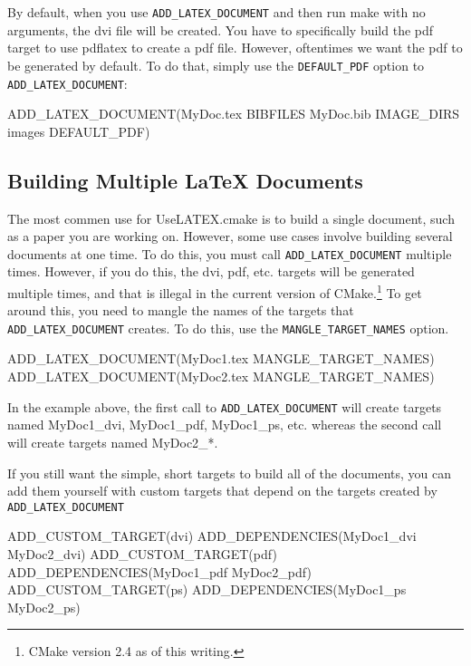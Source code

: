 \documentclass{article}
\newcommand*{\textfile}[1]{\textsf{#1}}
\newcommand*{\textcmake}[1]{\texttt{#1}}
\newcommand*{\textmaketarget}[1]{#1}
\newcommand*{\UseLATEX}{\textfile{UseLATEX.cmake}\xspace}
\newcommand*{\latex}{\LaTeX\xspace}
\newcommand*{\ald}{\textcmake{ADD\_LATEX\_DOCUMENT}\xspace}
\begin{document}
  By default, when you use \ald and then run make with no arguments, the
  dvi file will be created. You have to specifically build the pdf target
  to use \textfile{pdflatex} to create a pdf file. However, oftentimes we
  want the pdf to be generated by default. To do that, simply use the
  \textcmake{DEFAULT\_PDF} option to \ald:

  \begin{CodeListing}
ADD_LATEX_DOCUMENT(MyDoc.tex BIBFILES MyDoc.bib
                   IMAGE_DIRS images
		   DEFAULT_PDF)
  \end{CodeListing}

  \subsection{Building Multiple \latex Documents}
  \label{sec:BuldingMultipleLatexDocuments}

  The most commen use for \UseLATEX is to build a single document, such as
  a paper you are working on. However, some use cases involve building
  several documents at one time. To do this, you must call \ald multiple
  times. However, if you do this, the dvi, pdf, etc. targets will be
  generated multiple times, and that is illegal in the current version of
  CMake.\footnote{CMake version 2.4 as of this writing.} To get around
  this, you need to mangle the names of the targets that \ald creates. To
  do this, use the \textcmake{MANGLE\_TARGET\_NAMES} option.

  \begin{CodeListing}
ADD_LATEX_DOCUMENT(MyDoc1.tex MANGLE_TARGET_NAMES)
ADD_LATEX_DOCUMENT(MyDoc2.tex MANGLE_TARGET_NAMES)
  \end{CodeListing}

  In the example above, the first call to \ald will create targets named
  \textmaketarget{MyDoc1\_dvi}, \textmaketarget{MyDoc1\_pdf},
  \textmaketarget{MyDoc1\_ps}, etc. whereas the second call will create
  targets named \textmaketarget{MyDoc2\_*}.

  If you still want the simple, short targets to build all of the
  documents, you can add them yourself with custom targets that depend on
  the targets created by \ald

  \begin{CodeListing}
ADD_CUSTOM_TARGET(dvi)
ADD_DEPENDENCIES(MyDoc1_dvi MyDoc2_dvi)
ADD_CUSTOM_TARGET(pdf)
ADD_DEPENDENCIES(MyDoc1_pdf MyDoc2_pdf)
ADD_CUSTOM_TARGET(ps)
ADD_DEPENDENCIES(MyDoc1_ps MyDoc2_ps)
  \end{CodeListing}
\end{document}
